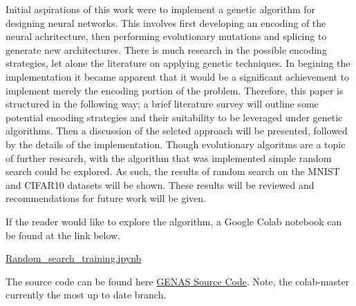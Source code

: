 Initial aspirations of this work were to implement a genetic algorithm for designing neural networks. This involves first developing an encoding of the neural achritecture, then performing evolutionary mutations and splicing to generate new architectures. There is much research in the possible encoding strategies, let alone the literature on applying genetic techniques. In begining the implementation it became apparent that it would be a significant achievement to implement merely the encoding portion of the problem. Therefore, this paper is structured in the following way; a brief literature survey will outline some potential encoding strategies and their suitability to be leveraged under genetic algorithms. Then a discussion of the selcted approach will be presented, followed by the details of the implementation. Though evolutionary algoritms are a topic of further research, with the algorithm that was implemented simple random search could be explored. As such, the results of random search on the MNIST and CIFAR10 datasets will be shown. These results will be reviewed and recommendations for future work will be given.

If the reader would like to explore the algorithm, a Google Colab notebook can be found at the link below.

\href{https://colab.research.google.com/github/KhanMechAI/genas/blob/colab-master/Random_search_training_demo.ipynb}{Random\_search\_training.ipynb}

The source code can be found here \href{https://github.com/KhanMechAI/genas.git}{GENAS Source Code}. Note, the colab-master currently the most up to date branch.




